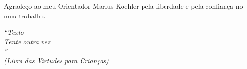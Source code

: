\documentclass[
	12pt,				%
	openright,			%
	twoside,			%
	a4paper,			%
	english,			%
	french,				%
	spanish,			%
	brazil				%
	]{abntex2}
\begin{document}
%      
%  


\begin{agradecimentos}
Agradeço ao meu Orientador Marlus Koehler pela liberdade e pela confiança no meu trabalho.

\end{agradecimentos}

\begin{epigrafe}
    \vspace*{\fill}
	\begin{flushright}
		\textit{``Texto\\
		Tente outra vez\\
		''\\
		(Livro das Virtudes para Crianças)}
	\end{flushright}
\end{epigrafe}

\end{document}
